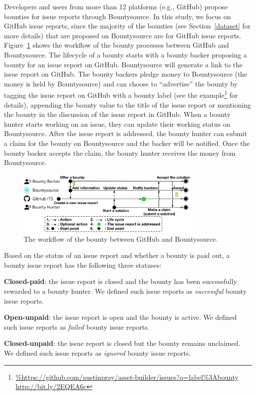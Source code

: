 Developers and users from more than 12 platforms (e.g., GitHub) propose bounties for issue reports through Bountysource. In this study, we focus on GitHub issue reports, since the majority of the bounties (see Section~\ref{dataset} for more details) that are proposed on Bountysource are for GitHub issue reports.
Figure~\ref{bountyflow} shows the workflow of the bounty processes between GitHub and Bountysource.
The lifecycle of a bounty starts with a bounty backer proposing a bounty for an issue report on GitHub. Bountysource will generate a link to the issue report on GitHub.
The bounty backers pledge money to Bountysource (the money is held by Bountysource) and can choose to ``advertise'' the bounty by tagging the issue report on GitHub with a bounty label (see the example\footnote{\url{%
http://bit.ly/2EQEA6c}} for details), appending the bounty value to the title of the issue report or mentioning the bounty in the discussion of the issue report in GitHub.
When a bounty hunter starts working on an issue, they can update their working status on Bountysource.
After the issue report is addressed, the bounty hunter can submit a claim for the bounty on Bountysource and the backer will be notified.
Once the bounty backer accepts the claim, the bounty hunter receives the money from Bountysource.

\begin{figure}[t]
   \centering\includegraphics[width=9cm]{pics/bg/bountyflow}
   \vspace{-0.2in}
  \caption{The workflow of the bounty between GitHub and Bountysource.}
  \label{bountyflow}
  \vspace{-0.1in}

\end{figure}

Based on the status of an issue report and whether a bounty is paid out, a bounty issue report has the following three statuses:

\noindent\textbf{Closed-paid}: the issue report is closed and the bounty has been successfully rewarded to a bounty hunter. We defined such issue reports as \emph{successful} bounty issue reports.

\noindent\textbf{Open-unpaid}: the issue report is open and the bounty is active. We defined such issue reports as \emph{failed} bounty issue reports.

\noindent\textbf{Closed-unpaid}: the issue report is closed but the bounty remains unclaimed. We defined such issue reports as \emph{ignored} bounty issue reports.




